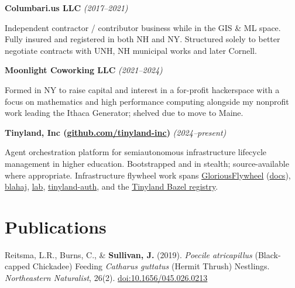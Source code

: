 \documentclass[11pt,letterpaper]{article}
\newcommand{\role}[2]{%
    \noindent\textbf{\color{secondary}#1} \hfill \textit{\color{muted}(#2)}\par\vspace{0.3em}
}
\newcommand{\cvlink}[2]{\href{#1}{\color{linkcolor}#2}}
\begin{document}
\role{Columbari.us LLC}{2017--2021}

Independent contractor / contributor business while in the GIS \& ML space. Fully insured and registered in both NH and NY. Structured solely to better negotiate contracts with UNH, NH municipal works and later Cornell.

\vspace{0.8em}

\role{Moonlight Coworking LLC}{2021--2024}

Formed in NY to raise capital and interest in a for-profit hackerspace with a focus on mathematics and high performance computing alongside my nonprofit work leading the Ithaca Generator; shelved due to move to Maine.

\vspace{0.8em}

\role{Tinyland, Inc (\cvlink{https://github.com/tinyland-inc}{github.com/tinyland-inc})}{2024--present}

Agent orchestration platform for semiautonomous infrastructure lifecycle management in higher education. Bootstrapped and in stealth; source-available where appropriate. Infrastructure flywheel work spans \cvlink{https://github.com/tinyland-inc/GloriousFlywheel}{GloriousFlywheel} (\cvlink{https://tinyland-inc.github.io/GloriousFlywheel/}{docs}), \cvlink{https://github.com/tinyland-inc/blahaj}{blahaj}, \cvlink{https://github.com/tinyland-inc/lab}{lab}, \cvlink{https://github.com/tinyland-inc/tinyland-auth}{tinyland-auth}, and the \cvlink{https://github.com/tinyland-inc/bazel-registry/pull/42}{Tinyland Bazel registry}.

\newpage

\section{Publications}
\label{sec:publications}

Reitsma, L.R., Burns, C., \& \textbf{Sullivan, J.} (2019). \textit{Poecile atricapillus} (Black-capped Chickadee) Feeding \textit{Catharus guttatus} (Hermit Thrush) Nestlings. \textit{Northeastern Naturalist}, 26(2). \cvlink{https://doi.org/10.1656/045.026.0213}{doi:10.1656/045.026.0213}
\end{document}
